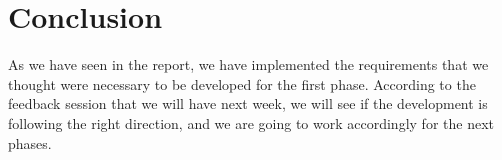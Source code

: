 \documentclass[a4paper, 12pt]{article}
\begin{document}
\section{Conclusion}
As we have seen in the report, we have implemented the requirements that we thought were necessary to be developed for the first phase. According to the feedback session that we will have next week, we will see if the development is following the right direction, and we are going to work accordingly for the next phases. 
\end{document}
